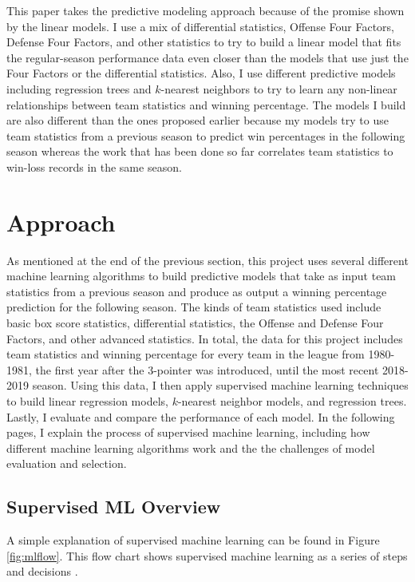 \documentclass[pageno]{jpaper}
\begin{document}
This paper takes the predictive modeling approach because of the promise shown by the linear models. I use a mix of differential statistics, Offense Four Factors, Defense Four Factors, and other statistics to try to build a linear model that fits the regular-season performance data even closer than the models that use just the Four Factors or the differential statistics. Also, I use different predictive models including regression trees and $k$-nearest neighbors to try to learn any non-linear relationships between team statistics and winning percentage. The models I build are also different than the ones proposed earlier because my models try to use team statistics from a previous season to predict win percentages in the following season whereas the work that has been done so far correlates team statistics to win-loss records in the same season.

\section{Approach}

As mentioned at the end of the previous section, this project uses several different machine learning algorithms to build predictive models that take as input team statistics from a previous season and produce as output a winning percentage prediction for the following season. The kinds of team statistics used include basic box score statistics, differential statistics, the Offense and Defense Four Factors, and other advanced statistics. In total, the data for this project includes team statistics and winning percentage for every team in the league from 1980-1981, the first year after the 3-pointer was introduced, until the most recent 2018-2019 season. Using this data, I then apply supervised machine learning techniques to build linear regression models, $k$-nearest neighbor models, and regression trees. Lastly, I evaluate and compare the performance of each model. In the following pages, I explain the process of supervised machine learning, including how different machine learning algorithms work and the the challenges of model evaluation and selection.

\subsection{Supervised ML Overview}

A simple explanation of supervised machine learning can be found in Figure \ref{fig:mlflow}. This flow chart shows supervised machine learning as a series of steps and decisions \cite{mitfundamentals}.
\end{document}
